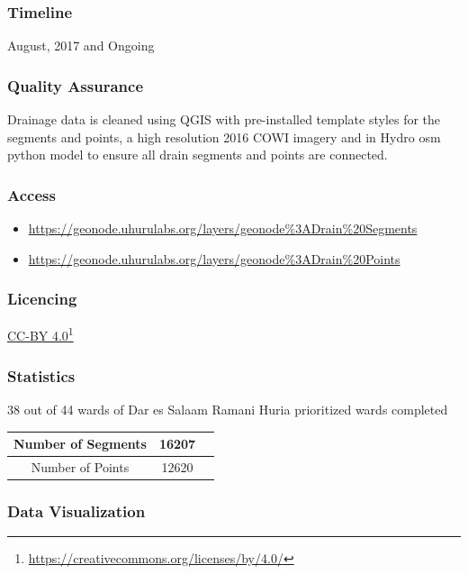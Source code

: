 \documentclass[a4paper,12pt,twoside]{article}
\begin{document}
\subsubsection{Timeline}
August, 2017 and Ongoing

\subsubsection{Quality Assurance}

Drainage data is cleaned using QGIS with pre-installed template styles for the segments and points, a high resolution 2016 COWI imagery and in Hydro osm python model to ensure all drain segments and points are connected.

\subsubsection{Access}
\begin{itemize}
    \item \href{https://geonode.uhurulabs.org/layers/geonode\%3ADrain\%20Segments}{https://geonode.uhurulabs.org/layers/geonode\%3ADrain\%20Segments}
    \item \href{https://geonode.uhurulabs.org/layers/geonode\%3ADrain\%20Points}{https://geonode.uhurulabs.org/layers/geonode\%3ADrain\%20Points}
\end{itemize}

\subsubsection{Licencing}
\href{https://creativecommons.org/licenses/by/4.0/}{CC-BY 4.0}\footnote{\url{https://creativecommons.org/licenses/by/4.0/}}

\subsubsection{Statistics}
38 out of 44 wards of Dar es Salaam Ramani Huria prioritized wards completed
\begin{center}
\begin{tabular}{ |c|c|c| }
 \hline
 Number of Segments & 16207 \\ 
 \hline
 Number of Points & 12620 \\ 
 \hline
\end{tabular}
\end{center}

\subsubsection{Data Visualization}
\end{document}
